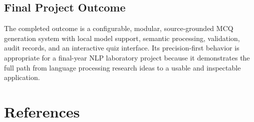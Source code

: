 \documentclass[12pt,a4paper]{report}
\begin{document}
\section*{Final Project Outcome}
The completed outcome is a configurable, modular, source-grounded MCQ generation system with local model support, semantic processing, validation, audit records, and an interactive quiz interface. Its precision-first behavior is appropriate for a final-year NLP laboratory project because it demonstrates the full path from language processing research ideas to a usable and inspectable application.

\clearpage
\chapter*{References}
\end{document}
